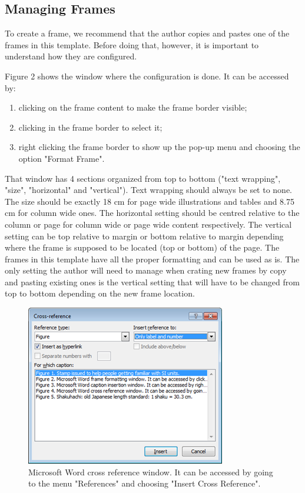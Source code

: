 \documentclass[10pt]{imeko_acta}
\begin{document}
\subsection{Managing Frames}

To create a frame, we recommend that the author copies and pastes one of the frames in this template. Before doing that, however, it is important to understand how they are configured. 

Figure 2 shows the window where the configuration is done. It can be accessed by: 
\begin{enumerate}
	\item clicking on the frame content to make the frame border visible;
	\item clicking in the frame border to select it;
	\item right clicking the frame border to show up the pop-up menu and choosing the option "Format Frame".
\end{enumerate}

That window has 4 sections organized from top to bottom ("text wrapping", "size", "horizontal" and "vertical"). 
Text wrapping should always be set to none. The size should be exactly 18 cm for page wide illustrations and tables and 8.75 cm for column wide ones. The horizontal setting should be centred relative to the column or page for column wide or page wide content respectively. The vertical setting can be top relative to margin or bottom relative to margin depending where the frame is supposed to be located (top or bottom) of the page.
The frames in this template have all the proper formatting and can be used as is. The only setting the author will need to manage when crating new frames by copy and pasting existing ones is the vertical setting that will have to be changed from top to bottom depending on the new frame location.

\begin{figure}[!tb]
	\centering
	\includegraphics[width=\columnwidth]{image4}
	\caption{Microsoft Word cross reference window. It can be accessed by going to the menu "References" and choosing "Insert Cross Reference".}
	\label{fig:image4}
\end{figure}
\end{document}
